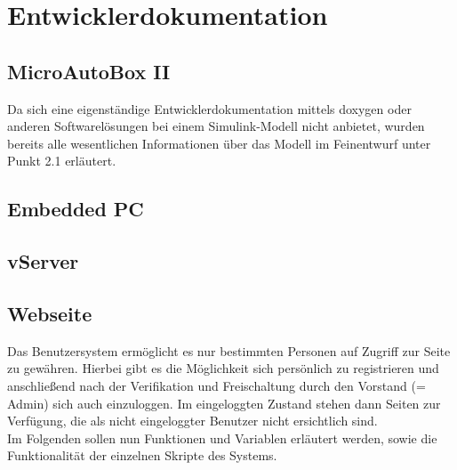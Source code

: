 \documentclass[fontsize = 12pt, paper = a4]{scrreprt}
\begin{document}

\chapter{Entwicklerdokumentation}




\section{MicroAutoBox II}

Da sich eine eigenständige Entwicklerdokumentation mittels doxygen oder anderen Softwarelösungen bei einem Simulink-Modell nicht anbietet, wurden bereits alle wesentlichen Informationen über das Modell im Feinentwurf unter Punkt 2.1 erläutert.


\section{Embedded PC}


\section{vServer}



\newpage

\section{Webseite}

Das Benutzersystem ermöglicht es nur bestimmten Personen auf Zugriff zur Seite zu gewähren. Hierbei gibt es die Möglichkeit sich persönlich zu registrieren und anschließend nach der Verifikation und Freischaltung durch den Vorstand (= Admin) sich auch einzuloggen. Im eingeloggten Zustand stehen dann Seiten zur Verfügung, die als nicht eingeloggter Benutzer nicht ersichtlich sind.\\

Im Folgenden sollen nun Funktionen und Variablen erläutert werden, sowie die Funktionalität der einzelnen Skripte des Systems.
\end{document}
